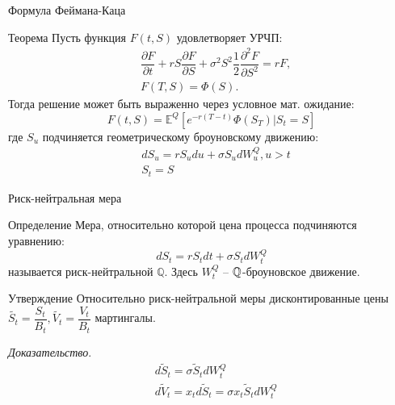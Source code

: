 \documentclass[aspectratio=169]{beamer}
\begin{document}
\begin{frame}{Формула Феймана-Каца}
    \begin{block}{Теорема}
        Пусть функция $F(t, S)$ удовлетворяет УРЧП:
        \begin{align*}
            &\dfrac{\partial F}{\partial t} + r S \dfrac{\partial F}{\partial S} + \sigma^2 S^2 \dfrac{1}{2}\dfrac{\partial^2 F}{\partial S^2} = r F ,\\
            &F(T, S) = \Phi(S).
        \end{align*}
        Тогда решение может быть выраженно через условное мат. ожидание:
        $$
            F(t, S) = \mathbb{E}^Q \left[ e^{-r(T-t)} \Phi(S_T) | S_t = S\right]
        $$где $S_u$ подчиняется геометрическому броуновскому движению:
        \begin{align*}
            &dS_u = r S_u du + \sigma S_u dW_u^Q, u > t \\
            &S_t = S
        \end{align*}
    \end{block}
\end{frame}

\begin{frame}{Риск-нейтральная мера}
    \begin{block}{Определение}
        Мера, относительно которой цена процесса подчиняются уравнению:
        $$
            dS_t = r S_t dt + \sigma S_t dW_t^Q
        $$ называется риск-нейтральной $\mathbb{Q}$. Здесь $W_t^Q$ -- $\mathbb{Q}$-броуновское движение.
    \end{block}
    \pause
    \begin{block}{Утверждение}
        Относительно риск-нейтральной меры дисконтированные цены $\widetilde{S_t} = \dfrac{S_t}{B_t}, \widetilde{V_t} = \dfrac{V_t}{B_t}$ мартингалы.
    \end{block}
    \pause
    \textit{Доказательство}. 
    \begin{align*}
        &d \widetilde S_t = \sigma \widetilde S_t dW_t^Q \\
        &d \widetilde V_t = x_t d \widetilde S_t = \sigma x_t \widetilde S_t dW_t^Q 
    \end{align*}
\end{frame}
\end{document}
